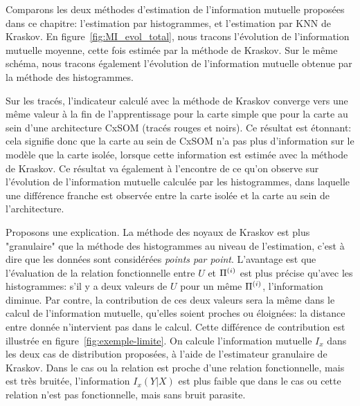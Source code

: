 Comparons les deux méthodes d'estimation de l'information mutuelle proposées dans ce chapitre: l'estimation par histogrammes, et l'estimation par KNN de Kraskov.
En figure~\ref{fig:MI_evol_total}, nous tracons l'évolution de l'information mutuelle moyenne, cette fois estimée par la méthode de Kraskov. Sur le même schéma, nous tracons également l'évolution de l'information mutuelle obtenue par la méthode des histogrammes. 

Sur les tracés, l'indicateur calculé avec la méthode de Kraskov converge vers une même valeur à la fin de l'apprentissage pour la carte simple que pour la carte au sein d'une architecture CxSOM (tracés rouges et noirs). Ce résultat est étonnant: cela signifie donc que la carte au sein de CxSOM n'a pas plus d'information sur le modèle que la carte isolée, lorsque cette information est estimée avec la méthode de Kraskov. Ce résultat va également à l'encontre de ce qu'on observe sur l'évolution de l'information mutuelle calculée par les histogrammes, dans laquelle une différence franche est observée entre la carte isolée et la carte au sein de l'architecture.

Proposons une explication.
La méthode des noyaux de Kraskov est plus "granulaire" que la méthode des histogrammes au niveau de l'estimation, c'est à dire que les données sont considérées \emph{points par point}. L'avantage est que l'évaluation de la relation fonctionnelle entre $U$ et $\Pi^{({i})}$ est plus précise qu'avec les histogrammes: s'il y a deux valeurs de $U$ pour un même $\Pi^{({i})}$, l'information diminue. Par contre, la contribution de ces deux valeurs sera la même dans le calcul de l'information mutuelle, qu'elles soient proches ou éloignées: la distance entre donnée n'intervient pas dans le calcul. Cette différence de contribution est illustrée en figure~\ref{fig:exemple-limite}. On calcule l'information mutuelle $I_x$ dans les deux cas de distribution proposées, à l'aide de l'estimateur granulaire de Kraskov. Dans le cas ou la relation est proche d'une relation fonctionnelle, mais est très bruitée, l'information $I_x(Y|X)$ est plus faible que dans le cas ou cette relation n'est pas fonctionnelle, mais sans bruit parasite.

